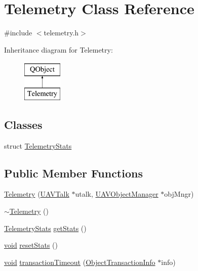 \hypertarget{class_telemetry}{\section{Telemetry Class Reference}
\label{class_telemetry}
}


{\ttfamily \#include $<$telemetry.\-h$>$}

Inheritance diagram for Telemetry\-:\begin{figure}[H]
\begin{center}
\leavevmode
\includegraphics[height=2.000000cm]{class_telemetry}
\end{center}
\end{figure}
\subsection*{Classes}
\begin{DoxyCompactItemize}
\item 
struct \hyperlink{struct_telemetry_1_1_telemetry_stats}{Telemetry\-Stats}
\end{DoxyCompactItemize}
\subsection*{Public Member Functions}
\begin{DoxyCompactItemize}
\item 
\hyperlink{group___u_a_v_talk_plugin_ga6998be3c493d7a742d8f54bcf235e823}{Telemetry} (\hyperlink{class_u_a_v_talk}{U\-A\-V\-Talk} $\ast$utalk, \hyperlink{class_u_a_v_object_manager}{U\-A\-V\-Object\-Manager} $\ast$obj\-Mngr)
\item 
\hyperlink{group___u_a_v_talk_plugin_ga5d74297211be2d8d48f38e2632c97de8}{$\sim$\-Telemetry} ()
\item 
\hyperlink{struct_telemetry_1_1_telemetry_stats}{Telemetry\-Stats} \hyperlink{group___u_a_v_talk_plugin_ga9f456df92180138a0adebc5e3afc3402}{get\-Stats} ()
\item 
\hyperlink{group___u_a_v_objects_plugin_ga444cf2ff3f0ecbe028adce838d373f5c}{void} \hyperlink{group___u_a_v_talk_plugin_ga6452c56eab6e4b7ce913566562a005ef}{reset\-Stats} ()
\item 
\hyperlink{group___u_a_v_objects_plugin_ga444cf2ff3f0ecbe028adce838d373f5c}{void} \hyperlink{group___u_a_v_talk_plugin_gab5d172ba63e07316e086a65c5bcc8d47}{transaction\-Timeout} (\hyperlink{class_object_transaction_info}{Object\-Transaction\-Info} $\ast$info)
\end{DoxyCompactItemize}


